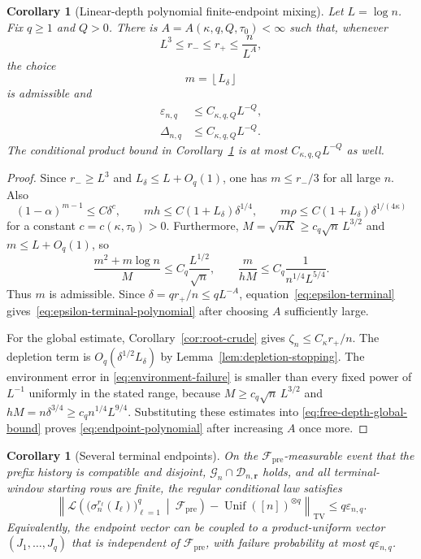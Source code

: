 \documentclass[11pt]{article}
\newcommand{\1}{\mathbf 1}
\newcommand{\TV}{\mathrm{TV}}
\newcommand{\Unif}{\operatorname{Unif}}
\newcommand{\cF}{\mathcal F}
\newcommand{\cG}{\mathcal G}
\newcommand{\cD}{\mathcal D}
\newcommand{\cL}{\mathcal L}
\newcommand{\eps}{\varepsilon}
\newtheorem{corollary}[theorem]{Corollary}
\theoremstyle{definition}
\theoremstyle{remark}
\begin{document}
\begin{corollary}[Linear-depth polynomial finite-endpoint mixing]
\label{cor:linear-depth}
Let $L=\log n$.  Fix $q\ge1$ and $Q>0$.  There is
$A=A(\kappa,q,Q,\tau_0)<\infty$ such that, whenever
\[
 L^3\le r_-\le r_+\le \frac{n}{L^A},
\]
the choice
\begin{equation}\label{eq:m-linear-depth}
 m=\left\lfloor L_\delta\right\rfloor
\end{equation}
is admissible and
\begin{align}
 \eps_{n,q}&\le C_{\kappa,q,Q}L^{-Q},
 \label{eq:epsilon-terminal-polynomial}\\
 \Delta_{n,q}&\le C_{\kappa,q,Q}L^{-Q}.
 \label{eq:endpoint-polynomial}
\end{align}
The conditional product bound in
Corollary~\ref{cor:several-terminal} is at most
$C_{\kappa,q,Q}L^{-Q}$ as well.
\end{corollary}

\begin{proof}
Since $r_-\ge L^3$ and $L_\delta\le L+O_q(1)$, one has
$m\le r_-/3$ for all large $n$.  Also
\[
 (1-\alpha)^{m-1}\le C\delta^{c},
 \qquad
 mh\le C(1+L_\delta)\delta^{1/4},
 \qquad
 m\rho\le C(1+L_\delta)\delta^{1/(4\kappa)}
\]
for a constant $c=c(\kappa,\tau_0)>0$.  Furthermore,
$M=\sqrt{nK}\ge c_q\sqrt n\,L^{3/2}$ and
$m\le L+O_q(1)$, so
\[
 \frac{m^2+m\log n}{M}\le C_q\frac{L^{1/2}}{\sqrt n},
 \qquad
 \frac{m}{hM}\le C_q\frac{1}{n^{1/4}L^{5/4}}.
\]
Thus $m$ is admissible.  Since
$\delta=qr_+/n\le qL^{-A}$, equation~\eqref{eq:epsilon-terminal}
gives~\eqref{eq:epsilon-terminal-polynomial} after choosing $A$
sufficiently large.

For the global estimate, Corollary~\ref{cor:root-crude} gives
$\zeta_n\le C_\kappa r_+/n$.  The depletion term is
$O_q(\delta^{1/2}L_\delta)$ by
Lemma~\ref{lem:depletion-stopping}.  The environment error in
\eqref{eq:environment-failure} is smaller than every fixed power of
$L^{-1}$ uniformly in the stated range, because
$M\ge c_q\sqrt n\,L^{3/2}$ and
$hM=n\delta^{3/4}\ge c_q n^{1/4}L^{9/4}$.
Substituting these estimates into
\eqref{eq:free-depth-global-bound} proves
\eqref{eq:endpoint-polynomial} after increasing $A$ once more.
\end{proof}

\begin{corollary}[Several terminal endpoints]
\label{cor:several-terminal}
On the $\cF_{\mathrm{pre}}$-measurable event that the prefix history is
compatible and disjoint, $\cG_n\cap\cD_{n,\mathbf r}$ holds, and all
terminal-window starting rows are finite, the regular conditional law
satisfies
\begin{equation}\label{eq:conditional-product-TV}
 \left\|
 \cL\left(
   \bigl(\sigma_n^{r_\ell}(I_\ell)\bigr)_{\ell=1}^q
   \ \middle|\ \cF_{\mathrm{pre}}
 \right)
 -\Unif([n])^{\otimes q}
 \right\|_{\TV}
 \leq q\eps_{n,q}.
\end{equation}
Equivalently, the endpoint vector can be coupled to a product-uniform
vector $(J_1,\dots,J_q)$ that is independent of
$\cF_{\mathrm{pre}}$, with failure probability at most $q\eps_{n,q}$.
\end{corollary}
\end{document}
